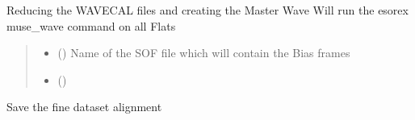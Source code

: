 \documentclass[letterpaper,10pt,english]{sphinxmanual}
\begin{document}
\begin{fulllineitems}
\begin{fulllineitems}
\label{\detokenize{api/pymusepipe:pymusepipe.prep_recipes_pipe.PipePrep.run_wave}}
\pysigstartsignatures
{}
\pysigstopsignatures
\sphinxAtStartPar
Reducing the WAVE\sphinxhyphen{}CAL files and creating the Master Wave
Will run the esorex muse\_wave command on all Flats
\begin{quote}\begin{description}
\begin{itemize}
\item {} 
\sphinxAtStartPar
{} (\sphinxstyleliteralemphasis{\sphinxupquote{ (}}\sphinxstyleliteralemphasis{\sphinxupquote{)}}) \textendash{} Name of the SOF file which will contain the Bias frames

\item {} 
\sphinxAtStartPar
{} () \textendash{} 

\end{itemize}

\end{description}\end{quote}

\end{fulllineitems}


\begin{fulllineitems}
\label{\detokenize{api/pymusepipe:pymusepipe.prep_recipes_pipe.PipePrep.save_fine_alignment}}
\pysigstartsignatures
{}
\pysigstopsignatures
\sphinxAtStartPar
Save the fine dataset alignment


\end{fulllineitems}
\end{fulllineitems}
\end{document}
